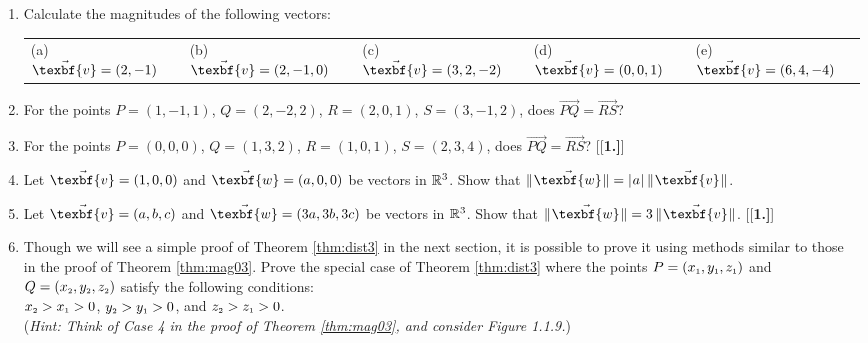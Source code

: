 \begin{enumerate}[\bfseries 1.]
 \item Calculate the magnitudes of the following vectors:\\
  \begin{tabular}{@{} l l l l l @{}}
   (a) $\vec{\texbf{v}} = (2,-1)$ & (b) $\vec{\texbf{v}} = (2,-1,0)$ & (c) $\vec{\texbf{v}} = (3,2,-2)$ & (d) $\vec{\texbf{v}} = (0,0,1)$ &
   (e) $\vec{\texbf{v}} = (6,4,-4)$
  \end{tabular}
 \item For the points $P =(1,-1,1)$, $Q=(2,-2,2)$, $R=(2,0,1)$, $S=(3,-1,2)$, does $\overrightarrow{PQ} =
  \overrightarrow{RS}$?
 \item For the points $P =(0,0,0)$, $Q=(1,3,2)$, $R=(1,0,1)$, $S=(2,3,4)$, does $\overrightarrow{PQ} =
  \overrightarrow{RS}$?
[{[\bfseries 1.]}]
 \item Let $\vec{\texbf{v}} = (1,0,0)$ and $\vec{\texbf{w}} = (a,0,0)$ be vectors in $\mathbb{R}^{3}$. Show that
 $\norm{\vec{\texbf{w}}} = \abs{a} \,\norm{\vec{\texbf{v}}}$.
 \item Let $\vec{\texbf{v}} = (a,b,c)$ and $\vec{\texbf{w}} = (3a,3b,3c)$ be vectors in $\mathbb{R}^{3}$. Show that
 $\norm{\vec{\texbf{w}}}  = 3 \,\norm{\vec{\texbf{v}}}$.
[{[\bfseries 1.]}]
 \piccaption[]{}
 \item Though we will see a simple proof of Theorem \ref{thm:dist3} in the next section, it is possible to prove it using
 methods similar to those in the proof of Theorem \ref{thm:mag03}.  Prove the special case of Theorem \ref{thm:dist3}
 where the points $P = (x_{\scriptscriptstyle 1},y_{\scriptscriptstyle 1},z_{\scriptscriptstyle 1})$ and $Q = (x_{\scriptscriptstyle 2},y_{\scriptscriptstyle 2},z_{\scriptscriptstyle 2})$
 satisfy the following conditions:\\
 $x_{\scriptscriptstyle 2} > x_{\scriptscriptstyle 1} > 0$, $y_{\scriptscriptstyle 2} > y_{\scriptscriptstyle 1} > 0$, and
 $z_{\scriptscriptstyle 2} > z_{\scriptscriptstyle 1} > 0$.\\(\emph{Hint: Think of Case 4 in the proof of
 Theorem \ref{thm:mag03}, and consider Figure 1.1.9.})\\
\end{enumerate}
\newpage
